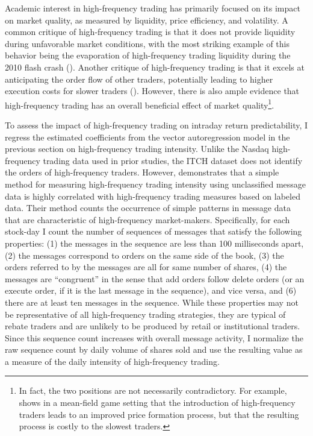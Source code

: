 Academic interest in high-frequency trading has primarily focused on its impact on market quality, as measured by liquidity, price efficiency, and volatility. A common critique of high-frequency trading is that it does not provide liquidity during unfavorable market conditions, with the most striking example of this behavior being the evaporation of high-frequency trading liquidity during the 2010 flash crash (\citet{Kirilenko2015}). Another critique of high-frequency trading is that it excels at anticipating the order flow of other traders, potentially leading to higher execution costs for slower traders (\citet{Hirschey2013}). However, there is also ample evidence that high-frequency trading has an overall beneficial effect of market quality\footnote{In fact, the two positions are not necessarily contradictory. For example, \citet{Lachapelle2013} shows in a mean-field game setting that the introduction of high-frequency traders leads to an improved price formation process, but that the resulting process is costly to the slowest traders.}.

To assess the impact of high-frequency trading on intraday return predictability, I regress the estimated coefficients from the vector autoregression model in the previous section on high-frequency trading intensity. Unlike the Nasdaq high-frequency trading data used in prior studies, the ITCH dataset does not identify the orders of high-frequency traders. However, \citet{Hasbrouck2013} demonstrates that a simple method for measuring high-frequency trading intensity using unclassified message data is highly correlated with high-frequency trading measures based on labeled data. Their method counts the occurrence of simple patterns in message data that are characteristic of high-frequency market-makers. Specifically, for each stock-day I count the number of sequences of messages that satisfy the following properties: (1) the messages in the sequence are less than 100 milliseconds apart, (2) the messages correspond to orders on the same side of the book, (3) the orders referred to by the messages are all for same number of shares, (4) the messages are ``congruent'' in the sense that add orders follow delete orders (or an execute order, if it is the last message in the sequence), and vice versa, and (6) there are at least ten messages in the sequence. While these properties may not be representative of all high-frequency trading strategies, they are typical of rebate traders and are unlikely to be produced by retail or institutional traders. Since this sequence count increases with overall message activity, I normalize the raw sequence count by daily volume of shares sold and use the resulting value as a measure of the daily intensity of high-frequency trading.

